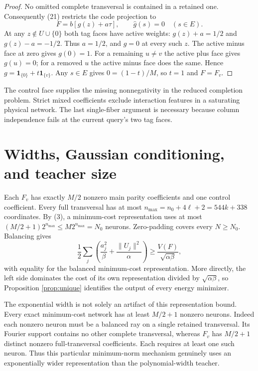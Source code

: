 \documentclass[11pt]{article}
\newcommand{\one}{\mathbf1}\newcommand{\relu}{\operatorname{ReLU}}
\begin{document}
\begin{proof}
No omitted complete transversal is contained in a retained one.
Consequently (21) restricts the code projection to
\[
                   F=b[g(z)+a\tau],\qquad
                           \widehat g(s)=0\quad(s\in E). \tag{23}
\]
At any $z\notin U\cup\{0\}$ both tag faces have active weights:
$g(z)+a=1/2$ and $g(z)-a=-1/2$. Thus $a=1/2$, and $g=0$ at every
such $z$. The active minus face at zero gives $g(0)=1$.
For a remaining $u\ne v$ the active plus face gives $g(u)=0$;
for a removed $u$ the active minus face does the same.
Hence $g=\one_{\{0\}}+t\one_{\{v\}}$.
Any $s\in E$ gives $0=(1-t)/M$, so $t=1$ and $F=F_v$.
\end{proof}

The control face supplies the missing nonnegativity in the reduced
completion problem. Strict mixed coefficients exclude interaction
features in a saturating physical network. The last single-fiber
argument is necessary because column independence fails at the
current query's two tag faces.

\section{Widths, Gaussian conditioning, and teacher size}
Each $F_v$ has exactly $M/2$ nonzero main parity coefficients and one
control coefficient. Every full transversal has at most
$n_{\max}=n_0+4\ell+2=544k+338$ coordinates.
By (3), a minimum-cost representation uses at most
$(M/2+1)2^{n_{\max}}\le M2^{n_{\max}}=N_0$ neurons.
Zero-padding covers every $N\ge N_0$. Balancing gives
\[
 \frac12\sum_j\left(\frac{a_j^2}{\beta}
                          +\frac{\|U_j\|^2}{\alpha}\right)
                   \ge\frac{V(F)}{\sqrt{\alpha\beta}},    \tag{24}
\]
with equality for the balanced minimum-cost representation.
More directly, the left side dominates the cost of its own
representation divided by $\sqrt{\alpha\beta}$, so Proposition
\ref{prop:unique} identifies the output of every energy minimizer.

The exponential width is not solely an artifact of this representation
bound. Every exact minimum-cost network has at least $M/2+1$ nonzero
neurons. Indeed each nonzero neuron must be a balanced ray on a single
retained transversal. Its Fourier support contains no other complete
transversal, whereas $F_v$ has $M/2+1$ distinct nonzero full-transversal
coefficients. Each requires at least one such neuron. Thus this
particular minimum-norm mechanism genuinely uses an exponentially
wider representation than the polynomial-width teacher.
\end{document}
